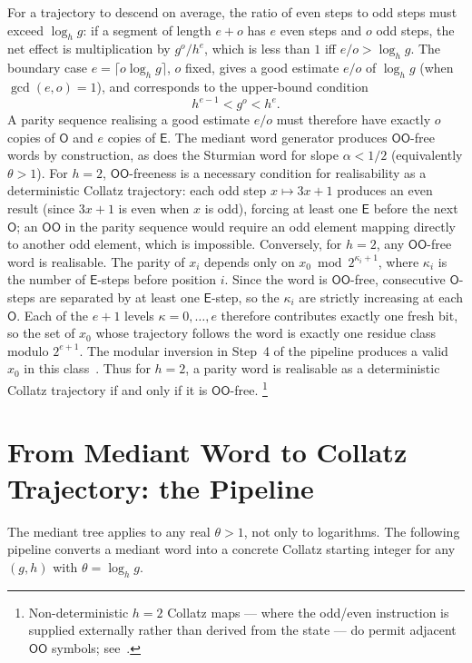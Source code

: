 \documentclass[12pt]{article}
\theoremstyle{definition}
\theoremstyle{remark}
\theoremstyle{plain}
\newcommand{\OO}{\mathsf{O}}
\newcommand{\EE}{\mathsf{E}}
\begin{document}
For a trajectory to descend on average, the ratio of even steps to odd steps must
exceed $\log_h g$: if a segment of length $e + o$ has $e$ even steps and $o$ odd
steps, the net effect is multiplication by $g^o / h^e$, which is less than $1$ iff
$e/o > \log_h g$.
The boundary case $e = \lceil o\log_h g \rceil$, $o$ fixed, gives a good estimate
$e/o$ of $\log_h g$ (when $\gcd(e,o)=1$), and corresponds to the upper-bound condition
\[
  h^{e-1} < g^o < h^e.
\]
A parity sequence realising a good estimate $e/o$ must therefore have exactly $o$
copies of $\OO$ and $e$ copies of $\EE$.
The mediant word generator produces $\OO\OO$-free words by construction, as does the
Sturmian word for slope $\alpha < 1/2$ (equivalently $\theta > 1$).
For $h = 2$, $\OO\OO$-freeness is a necessary condition for realisability as a
deterministic Collatz trajectory: each odd step $x \mapsto 3x+1$ produces an even
result (since $3x+1$ is even when $x$ is odd), forcing at least one $\EE$ before
the next $\OO$; an $\OO\OO$ in the parity sequence would require an odd element
mapping directly to another odd element, which is impossible.
Conversely, for $h = 2$, any $\OO\OO$-free word is realisable.
The parity of $x_i$ depends only on $x_0 \bmod 2^{\kappa_i + 1}$, where $\kappa_i$
is the number of $\EE$-steps before position $i$.
Since the word is $\OO\OO$-free, consecutive $\OO$-steps are separated by at least
one $\EE$-step, so the $\kappa_i$ are strictly increasing at each $\OO$.
Each of the $e+1$ levels $\kappa = 0, \ldots, e$ therefore contributes exactly one
fresh bit, so the set of $x_0$ whose trajectory follows the word is exactly one
residue class modulo $2^{e+1}$.
The modular inversion in Step~4 of the pipeline produces a valid $x_0$ in this
class~\cite{paper71}.
Thus for $h = 2$, a parity word is realisable as a deterministic Collatz trajectory
if and only if it is $\OO\OO$-free.%
\footnote{Non-deterministic $h = 2$ Collatz maps --- where the odd/even instruction
is supplied externally rather than derived from the state --- do permit adjacent
$\OO\OO$ symbols; see~\cite{nondeterministic}.}

\section{From Mediant Word to Collatz Trajectory: the Pipeline}
\label{sec:pipeline}

The mediant tree applies to any real $\theta > 1$, not only to logarithms.
The following pipeline converts a mediant word into a concrete Collatz starting
integer for any $(g, h)$ with $\theta = \log_h g$.
\end{document}
